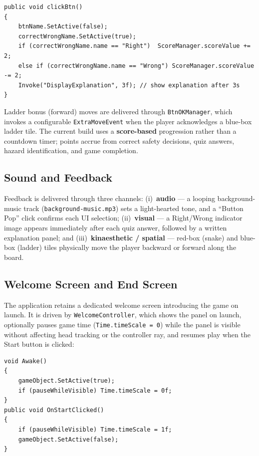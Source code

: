 \documentclass[a4paper,12pt]{article}
\begin{document}
\begin{lstlisting}[language={[Sharp]C}]
public void clickBtn()
{
    btnName.SetActive(false);
    correctWrongName.SetActive(true);
    if (correctWrongName.name == "Right")  ScoreManager.scoreValue += 2;
    else if (correctWrongName.name == "Wrong") ScoreManager.scoreValue -= 2;
    Invoke("DisplayExplanation", 3f); // show explanation after 3s
}
\end{lstlisting}

Ladder bonus (forward) moves are delivered through \texttt{BtnOKManager}, which invokes a configurable \texttt{ExtraMoveEvent} when the player acknowledges a blue-box ladder tile. The current build uses a \textbf{score-based} progression rather than a countdown timer; points accrue from correct safety decisions, quiz answers, hazard identification, and game completion.

\subsection{Sound and Feedback}

Feedback is delivered through three channels: (i)~\textbf{audio} --- a looping background-music track (\texttt{background-music.mp3}) sets a light-hearted tone, and a ``Button Pop'' click confirms each UI selection; (ii)~\textbf{visual} --- a Right/Wrong indicator image appears immediately after each quiz answer, followed by a written explanation panel; and (iii)~\textbf{kinaesthetic / spatial} --- red-box (snake) and blue-box (ladder) tiles physically move the player backward or forward along the board.

\subsection{Welcome Screen and End Screen}

The application retains a dedicated welcome screen introducing the game on launch. It is driven by \texttt{WelcomeController}, which shows the panel on launch, optionally pauses game time (\texttt{Time.timeScale = 0}) while the panel is visible without affecting head tracking or the controller ray, and resumes play when the Start button is clicked:

\begin{lstlisting}[language={[Sharp]C}]
void Awake()
{
    gameObject.SetActive(true);
    if (pauseWhileVisible) Time.timeScale = 0f;
}
public void OnStartClicked()
{
    if (pauseWhileVisible) Time.timeScale = 1f;
    gameObject.SetActive(false);
}
\end{lstlisting}
\end{document}
